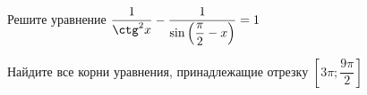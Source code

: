 \begin{ex}
	\begin{condition}
		\begin{enumcols}[label=\asbuk*)]
			\item Решите уравнение \( \dfrac{1}{\ctg^2 x} - \dfrac{1}{\sin{\left(\dfrac{\pi}{2} - x\right)}} = 1 \)
			\item Найдите все корни уравнения, принадлежащие отрезку \(  \left[3\pi;\dfrac{9\pi}{2}\right] \)
		\end{enumcols}
	\end{condition}
\end{ex}